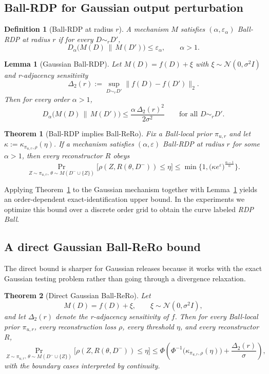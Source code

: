 \documentclass[conference,compsoc]{IEEEtran}
\newtheorem{definition}{Definition}
\newtheorem{theorem}{Theorem}
\newtheorem{lemma}{Lemma}
\begin{document}
\subsection{Ball-RDP for Gaussian output perturbation}

\begin{definition}[Ball-RDP at radius $r$]
A mechanism $M$ satisfies \emph{$(\alpha,\varepsilon_\alpha)$ Ball-RDP at radius $r$} if for every $D\sim_r D'$,
\[
D_\alpha\big(M(D)\,\|\,M(D')\big)\le \varepsilon_\alpha,
\qquad \alpha>1.
\]
\end{definition}

\begin{lemma}[Gaussian Ball-RDP]
\label{lem:gaussian-ball-rdp}
Let $M(D)=f(D)+\xi$ with $\xi\sim\mathcal{N}(0,\sigma^2 I)$ and r-adjacency sensitivity
\[
\Delta_2(r):=\sup_{D\sim_r D'}\|f(D)-f(D')\|_2.
\]
Then for every order $\alpha>1$,
\[
D_\alpha\big(M(D)\,\|\,M(D')\big)
\le
\frac{\alpha\,\Delta_2(r)^2}{2\sigma^2}
\qquad \text{for all }D\sim_r D'.
\]
\end{lemma}

\begin{theorem}[Ball-RDP implies Ball-ReRo]
\label{thm:ball-rdp-rero}
Fix a Ball-local prior $\pi_{u,r}$ and let $\kappa:=\kappa_{\pi_{u,r},\rho}(\eta)$. If a mechanism satisfies $(\alpha,\varepsilon)$ Ball-RDP at radius $r$ for some $\alpha>1$, then every reconstructor $R$ obeys
\[
\Pr_{Z\sim\pi_{u,r},\,\theta\sim M(D^-\cup\{Z\})}
\big[\rho(Z,R(\theta,D^-))\le \eta\big]
\le
\min\Big\{1,\big(\kappa e^{\varepsilon}\big)^{\frac{\alpha-1}{\alpha}}\Big\}.
\]
\end{theorem}

Applying Theorem~\ref{thm:ball-rdp-rero} to the Gaussian mechanism together with Lemma~\ref{lem:gaussian-ball-rdp} yields an order-dependent exact-identification upper bound. In the experiments we optimize this bound over a discrete order grid to obtain the curve labeled \emph{RDP Ball}.

\subsection{A direct Gaussian Ball-ReRo bound}

The direct bound is sharper for Gaussian releases because it works with the exact Gaussian testing problem rather than going through a divergence relaxation.

\begin{theorem}[Direct Gaussian Ball-ReRo]
\label{thm:direct-gaussian-rero}
Let
\[
M(D)=f(D)+\xi,
\qquad
\xi\sim\mathcal{N}(0,\sigma^2 I),
\]
and let $\Delta_2(r)$ denote the r-adjacency sensitivity of $f$. Then for every Ball-local prior $\pi_{u,r}$, every reconstruction loss $\rho$, every threshold $\eta$, and every reconstructor $R$,
\[
\Pr_{Z\sim\pi_{u,r},\,\theta\sim M(D^-\cup\{Z\})}
\big[\rho(Z,R(\theta,D^-))\le \eta\big]
\le
\Phi\!\left(
\Phi^{-1}\!\big(\kappa_{\pi_{u,r},\rho}(\eta)\big)
+
\frac{\Delta_2(r)}{\sigma}
\right),
\]
with the boundary cases interpreted by continuity.
\end{theorem}
\end{document}
